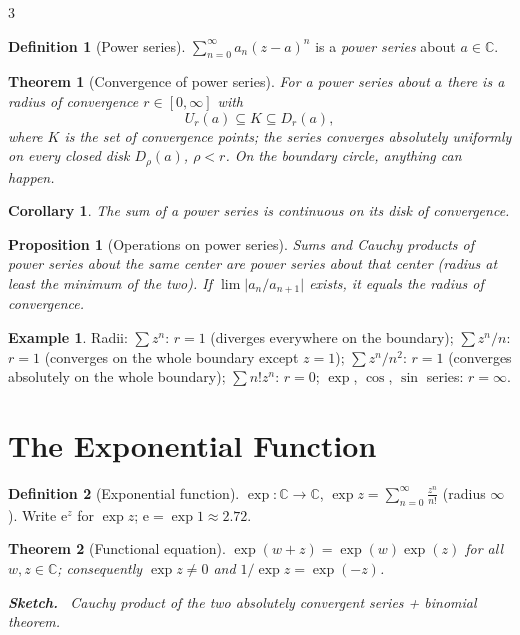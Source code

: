 \documentclass[10pt,a4paper,landscape]{article}
\theoremstyle{definition}
\newtheorem{defn}{Definition}[section]
\newtheorem{exm}{Example}[section]
\theoremstyle{plain}
\newtheorem{thm}{Theorem}[section]
\newtheorem{prop}{Proposition}[section]
\newtheorem{cor}{Corollary}[section]
\theoremstyle{remark}
\newcommand{\C}{\mathbb{C}}
\newcommand{\e}{\mathrm{e}}
\newcommand{\abs}[1]{\lvert #1 \rvert}
\newcommand{\oo}{\infty}
\newcommand{\ball}[1]{U_{#1}}
\newcommand{\cball}[1]{D_{#1}}
\newenvironment{proofsketch}{%
  \par\small\color{exgray}\textbf{Sketch.}\ }%
  {\par}
\begin{document}
\begin{multicols*}{3}
\begin{defn}[Power series]
$\sum_{n=0}^{\oo} a_n (z-a)^n$ is a \emph{power series} about $a \in \C$.
\end{defn}

\begin{thm}[Convergence of power series]
For a power series about $a$ there is a \emph{radius of convergence} $r \in [0,\oo]$ with
\[
\ball{r}(a) \subseteq K \subseteq \cball{r}(a),
\]
where $K$ is the set of convergence points; the series converges \emph{absolutely uniformly} on every closed disk $\cball{\rho}(a)$, $\rho < r$. On the boundary circle, anything can happen.
\end{thm}

\begin{cor}
The sum of a power series is continuous on its disk of convergence.
\end{cor}

\begin{prop}[Operations on power series]
Sums and Cauchy products of power series about the same center are power series about that center (radius at least the minimum of the two). If $\lim \abs{a_n/a_{n+1}}$ exists, it equals the radius of convergence.
\end{prop}

\begin{exm}
Radii: $\sum z^n$: $r=1$ (diverges everywhere on the boundary); $\sum z^n/n$: $r=1$ (converges on the whole boundary except $z=1$); $\sum z^n/n^2$: $r=1$ (converges absolutely on the whole boundary); $\sum n! z^n$: $r=0$; $\exp$, $\cos$, $\sin$ series: $r=\oo$.
\end{exm}

\section{The Exponential Function}

\begin{defn}[Exponential function]
$\exp: \C \to \C$, $\exp z = \sum_{n=0}^{\oo} \frac{z^n}{n!}$ (radius $\oo$). Write $\e^z$ for $\exp z$; $\e = \exp 1 \approx 2.72$.
\end{defn}

\begin{thm}[Functional equation]
$\exp(w+z) = \exp(w)\exp(z)$ for all $w,z \in \C$; consequently $\exp z \neq 0$ and $1/\exp z = \exp(-z)$.
\begin{proofsketch}
Cauchy product of the two absolutely convergent series + binomial theorem.
\end{proofsketch}
\end{thm}


\end{multicols*}
\end{document}
